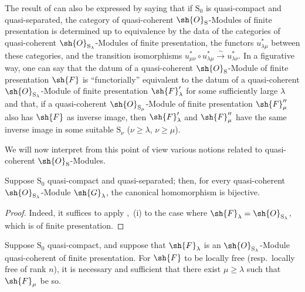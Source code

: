 \begin{env}[8.5.3]
\label{IV.8.5.3}
The result of  can also be expressed by saying that if $\mathrm{S}_0$ is quasi-compact and quasi-separated, the category of quasi-coherent $\sh{O}_\mathrm{S}$-Modules of finite presentation is determined up to equivalence by the data of the categories of quasi-coherent $\sh{O}_{\mathrm{S}_\lambda}$-Modules of finite presentation, the functors $u_{\lambda\mu}^*$ between these categories, and the transition isomorphisms $u_{\mu\nu}^*\circ u_{\lambda\mu}^*\xrightarrow{\sim}u_{\lambda\nu}^*$.
In a figurative way, one can say that the datum of a quasi-coherent $\sh{O}_\mathrm{S}$-Module of finite presentation $\sh{F}$ is ``functorially'' equivalent to the datum of a quasi-coherent $\sh{O}_{\mathrm{S}_\lambda}$-Module of finite presentation $\sh{F}'_\lambda$ for some sufficiently large $\lambda$ and that, if a quasi-coherent $\sh{O}_{\mathrm{S}_\mu}$-Module of finite presentation $\sh{F}''_\mu$ also has $\sh{F}$ as inverse image, then $\sh{F}'_\lambda$ and $\sh{F}''_\mu$ have the same inverse image in some suitable $\mathrm{S}_\nu$ ($\nu\geqslant\lambda$, $\nu\geqslant\mu$).

We will now interpret from this point of view various notions related to quasi-coherent $\sh{O}_\mathrm{S}$-Modules.
\end{env}

\begin{corollary}[8.5.4]
\label{IV.8.5.4}
Suppose $\mathrm{S}_0$ quasi-compact and quasi-separated; then, for every quasi-coherent $\sh{O}_{\mathrm{S}_\lambda}$-Module $\sh{G}_\lambda$, the canonical homomorphism  is bijective.
\end{corollary}

\begin{proof}
Indeed, it suffices to apply ,~(i) to the case where $\sh{F}_\lambda=\sh{O}_{\mathrm{S}_\lambda}$, which is of finite presentation.
\end{proof}

\begin{proposition}[8.5.5]
\label{IV.8.5.5}
Suppose $\mathrm{S}_0$ quasi-compact, and suppose that $\sh{F}_\lambda$ is an $\sh{O}_{\mathrm{S}_\lambda}$-Module quasi-coherent of finite presentation.
For $\sh{F}$ to be locally free (resp.\ locally free of rank $n$), it is necessary and sufficient that there exist $\mu\geqslant\lambda$ such that $\sh{F}_\mu$ be so.
\end{proposition}

